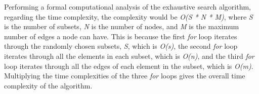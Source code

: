 \documentclass[...]{revdetua}
\begin{document}
Performing a formal computational analysis of the exhaustive search algorithm, regarding the time complexity, the complexity would be \textit{O(S * N * M)}, where \textit{S} is the number of subsets, \textit{N} is the number of nodes, and \textit{M} is the maximum number of edges a node can have. This is because the first \textit{for} loop iterates through the randomly chosen  subsets, \textit{S}, which is \textit{O(s)}, the second \textit{for} loop iterates through all the elements in each subset, which is \textit{O(n)}, and the third \textit{for} loop iterates through all the edges of each element in the subset, which is \textit{O(m)}. Multiplying the time complexities of the three \textit{for} loops gives the overall time complexity of the algorithm.

\begin{figure}[htp]
\centering 




\end{figure}
\end{document}
